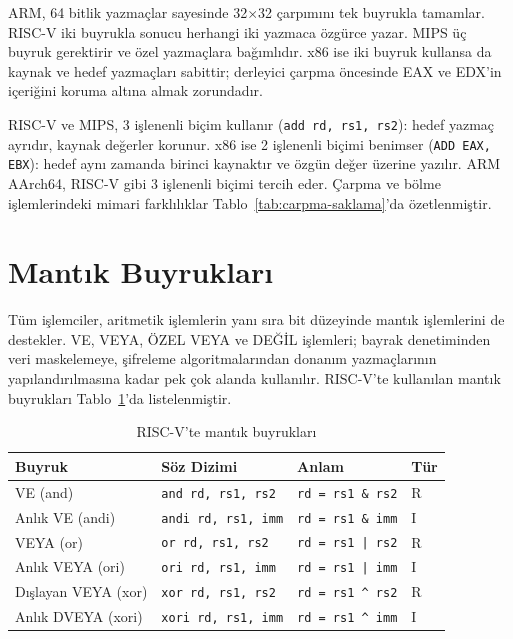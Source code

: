 \begin{ornek}[3.11]
ARM, 64 bitlik yazmaçlar sayesinde 32$\times$32 çarpımını tek buyrukla tamamlar. RISC-V iki buyrukla sonucu herhangi iki yazmaca özgürce yazar. MIPS üç buyruk gerektirir ve özel yazmaçlara bağımlıdır. x86 ise iki buyruk kullansa da kaynak ve hedef yazmaçları sabittir; derleyici çarpma öncesinde EAX ve EDX'in içeriğini koruma altına almak zorundadır.
\end{ornek}

\begin{karsilastirma}
RISC-V ve MIPS, 3 işlenenli biçim kullanır (\texttt{add rd, rs1, rs2}): hedef yazmaç ayrıdır, kaynak değerler korunur. x86 ise 2 işlenenli biçimi benimser (\texttt{ADD EAX, EBX}): hedef aynı zamanda birinci kaynaktır ve özgün değer üzerine yazılır. ARM AArch64, RISC-V gibi 3 işlenenli biçimi tercih eder. Çarpma ve bölme işlemlerindeki mimari farklılıklar Tablo~\ref{tab:carpma-saklama}'da özetlenmiştir.
\end{karsilastirma}

\section{Mantık Buyrukları}
\label{sec:mantik-buyruklar}

Tüm işlemciler, aritmetik işlemlerin yanı sıra bit düzeyinde mantık işlemlerini de destekler. VE, VEYA, ÖZEL VEYA ve DEĞİL işlemleri; bayrak denetiminden veri maskelemeye, şifreleme algoritmalarından donanım yazmaçlarının yapılandırılmasına kadar pek çok alanda kullanılır. RISC-V'te kullanılan mantık buyrukları Tablo~\ref{tab:mantik-buyruklar}'da listelenmiştir.

\begin{table}[H]
\centering
\caption{RISC-V'te mantık buyrukları}
\label{tab:mantik-buyruklar}
\begin{tabular}{llll}
\toprule
\textbf{Buyruk} & \textbf{Söz Dizimi} & \textbf{Anlam} & \textbf{Tür} \\
\midrule
VE (and)            & \texttt{and rd, rs1, rs2}   & \texttt{rd = rs1 \& rs2}      & R \\
Anlık VE (andi)     & \texttt{andi rd, rs1, imm}  & \texttt{rd = rs1 \& imm}      & I \\
VEYA (or)           & \texttt{or rd, rs1, rs2}    & \texttt{rd = rs1 | rs2}       & R \\
Anlık VEYA (ori)    & \texttt{ori rd, rs1, imm}   & \texttt{rd = rs1 | imm}       & I \\
Dışlayan VEYA (xor) & \texttt{xor rd, rs1, rs2}  & \texttt{rd = rs1 \^{} rs2}    & R \\
Anlık DVEYA (xori)  & \texttt{xori rd, rs1, imm} & \texttt{rd = rs1 \^{} imm}    & I \\
\bottomrule
\end{tabular}
\end{table}

